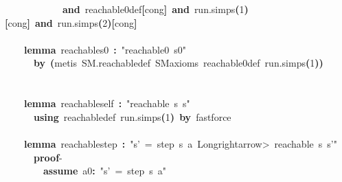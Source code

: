 \documentclass{article}
\newcommand{\syntaxKEYWORDA}[1]{\textcolor[rgb]{0.0,0.4,0.6}{\textbf{#1}}}
\newcommand{\syntaxKEYWORDB}[1]{\textcolor[rgb]{0.0,0.6,0.4}{\textbf{#1}}}
\newcommand{\syntaxKEYWORDC}[1]{\textcolor[rgb]{0.0,0.6,1.0}{\textbf{#1}}}
\newcommand{\syntaxLITERALA}[1]{\textcolor[rgb]{1.0,0.0,0.8}{#1}}
\newcommand{\syntaxOPERATOR}[1]{\textcolor[rgb]{0.0,0.0,0.0}{\textbf{#1}}}
\newcommand{\syntaxKEYWORDA}[1]{\textcolor[rgb]{0.0,0.4,0.6}{\textbf{#1}}}
\newcommand{\syntaxKEYWORDB}[1]{\textcolor[rgb]{0.0,0.6,0.4}{\textbf{#1}}}
\newcommand{\syntaxKEYWORDC}[1]{\textcolor[rgb]{0.0,0.6,1.0}{\textbf{#1}}}
\newcommand{\syntaxLITERALA}[1]{\textcolor[rgb]{1.0,0.0,0.8}{#1}}
\newcommand{\syntaxOPERATOR}[1]{\textcolor[rgb]{0.0,0.0,0.0}{\textbf{#1}}}
\newcommand{\syntaxKEYWORDA}[1]{\textcolor[rgb]{0.0,0.4,0.6}{\textbf{#1}}}
\newcommand{\syntaxKEYWORDB}[1]{\textcolor[rgb]{0.0,0.6,0.4}{\textbf{#1}}}
\newcommand{\syntaxKEYWORDC}[1]{\textcolor[rgb]{0.0,0.6,1.0}{\textbf{#1}}}
\newcommand{\syntaxLITERALA}[1]{\textcolor[rgb]{1.0,0.0,0.8}{#1}}
\newcommand{\syntaxOPERATOR}[1]{\textcolor[rgb]{0.0,0.0,0.0}{\textbf{#1}}}
\newcommand{\syntaxKEYWORDA}[1]{\textcolor[rgb]{0.0,0.4,0.6}{#1}}
\newcommand{\syntaxKEYWORDB}[1]{\textcolor[rgb]{0.0,0.6,0.4}{#1}}
\newcommand{\syntaxKEYWORDC}[1]{\textcolor[rgb]{0.0,0.6,1.0}{#1}}
\newcommand{\syntaxLITERALA}[1]{\textcolor[rgb]{1.0,0.0,0.8}{\textbf{#1}}}
\newcommand{\syntaxOPERATOR}[1]{\textcolor[rgb]{0.0,0.0,0.0}{#1}}
\newcommand{\syntaxKEYWORDA}[1]{\textcolor[rgb]{0.0,0.4,0.6}{\textbf{#1}}}
\newcommand{\syntaxKEYWORDB}[1]{\textcolor[rgb]{0.0,0.6,0.4}{\textbf{#1}}}
\newcommand{\syntaxKEYWORDC}[1]{\textcolor[rgb]{0.0,0.6,1.0}{\textbf{#1}}}
\newcommand{\syntaxLITERALA}[1]{\textcolor[rgb]{1.0,0.0,0.8}{#1}}
\newcommand{\syntaxOPERATOR}[1]{\textcolor[rgb]{0.0,0.0,0.0}{\textbf{#1}}}
\newcommand{\syntaxKEYWORDA}[1]{\textcolor[rgb]{0.0,0.4,0.6}{\textbf{#1}}}
\newcommand{\syntaxKEYWORDB}[1]{\textcolor[rgb]{0.0,0.6,0.4}{\textbf{#1}}}
\newcommand{\syntaxKEYWORDC}[1]{\textcolor[rgb]{0.0,0.6,1.0}{\textbf{#1}}}
\newcommand{\syntaxLITERALA}[1]{\textcolor[rgb]{1.0,0.0,0.8}{#1}}
\newcommand{\syntaxOPERATOR}[1]{\textcolor[rgb]{0.0,0.0,0.0}{\textbf{#1}}}
\begin{document}
{\ }{\ }{\ }{\ }{\ }{\ }{\ }{\ }{\ }{\ }{\ }{\ }\syntaxKEYWORDB{and}{\ }reachable0\usebox{\underscorebox}def\syntaxOPERATOR{{[}}cong\syntaxOPERATOR{{]}}{\ }\syntaxKEYWORDB{and}{\ }run.simps\syntaxOPERATOR{(}1\syntaxOPERATOR{)}\syntaxOPERATOR{{[}}cong\syntaxOPERATOR{{]}}{\ }\syntaxKEYWORDB{and}{\ }run.simps\syntaxOPERATOR{(}2\syntaxOPERATOR{)}\syntaxOPERATOR{{[}}cong\syntaxOPERATOR{{]}}\hspace*{\fill}\\
\hspace*{\fill}\\
{\ }{\ }{\ }{\ }\syntaxKEYWORDA{lemma}{\ }reachable\usebox{\underscorebox}s0{\ }\syntaxOPERATOR{:}{\ }\syntaxLITERALA{"reachable0{\ }s0"}\hspace*{\fill}\\
{\ }{\ }{\ }{\ }{\ }{\ }\syntaxKEYWORDA{by}{\ }\syntaxOPERATOR{(}metis{\ }SM.reachable\usebox{\underscorebox}def{\ }SM\usebox{\underscorebox}axioms{\ }reachable0\usebox{\underscorebox}def{\ }run.simps\syntaxOPERATOR{(}1\syntaxOPERATOR{)}\syntaxOPERATOR{)}{\ }\hspace*{\fill}\\
\hspace*{\fill}\\
{\ }{\ }{\ }{\ }\hspace*{\fill}\\
{\ }{\ }{\ }{\ }\syntaxKEYWORDA{lemma}{\ }reachable\usebox{\underscorebox}self{\ }\syntaxOPERATOR{:}{\ }\syntaxLITERALA{"reachable{\ }s{\ }s"}\hspace*{\fill}\\
{\ }{\ }{\ }{\ }{\ }{\ }\syntaxKEYWORDA{using}{\ }reachable\usebox{\underscorebox}def{\ }run.simps\syntaxOPERATOR{(}1\syntaxOPERATOR{)}{\ }\syntaxKEYWORDA{by}{\ }fastforce\hspace*{\fill}\\
\hspace*{\fill}\\
{\ }{\ }{\ }{\ }\syntaxKEYWORDA{lemma}{\ }reachable\usebox{\underscorebox}step{\ }\syntaxOPERATOR{:}{\ }\syntaxLITERALA{"s'{\ }={\ }step{\ }s{\ }a{\ }\<Longrightarrow>{\ }reachable{\ }s{\ }s'"}\hspace*{\fill}\\
{\ }{\ }{\ }{\ }{\ }{\ }\syntaxKEYWORDA{proof}{-}\hspace*{\fill}\\
{\ }{\ }{\ }{\ }{\ }{\ }{\ }{\ }\syntaxKEYWORDC{assume}{\ }a0\syntaxOPERATOR{:}{\ }\syntaxLITERALA{"s'{\ }={\ }step{\ }s{\ }a"}\hspace*{\fill}\\
\end{document}
